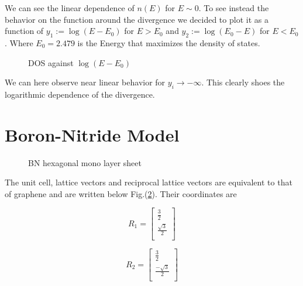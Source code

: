 \documentclass[a4paper]{article}
\begin{document}
We can see the linear dependence of $n(E)$ for $E \sim 0$. To see instead the behavior on the function around the divergence we decided to plot it as a function of $y_1:=\log(E-E_{0})$ for $E>E_0$ and $y_2:=\log(E_0-E)$ for $E<E_0$. Where $E_{0} = 2.479 $ is the Energy that maximizes the density of states.

\begin{figure}[h!]
\centering
\caption{\label{fig:frog}DOS against $\log(E-E_{0})$}
\end{figure}

We can here observe near linear behavior for $y_i\rightarrow-\infty$.
This clearly shoes the logarithmic dependence of the divergence.

\section{Boron-Nitride Model}

\begin{figure}[h!]
\centering
\caption{\label{BN} BN hexagonal mono layer sheet}
\end{figure}
The unit cell, lattice vectors and reciprocal lattice vectors are equivalent to that of graphene and are written below Fig.(\ref{BN}). Their coordinates are \\
\begin{minipage}{0.5\textwidth}
\centering
\begin{equation*}
R_1 =
\begin{bmatrix}
	\frac{3}{2} \\
    \frac{\sqrt{3}}{2}  \\
    
\end{bmatrix}
\end{equation*}

\end{minipage}
\begin{minipage}{0.5\textwidth}
\centering
\begin{equation*}
R_2 =
\begin{bmatrix}
    \frac{3}{2} \\
    \frac{-\sqrt{3}}{2}  \\
\end{bmatrix}
\end{equation*}
\end{minipage}
\end{document}
